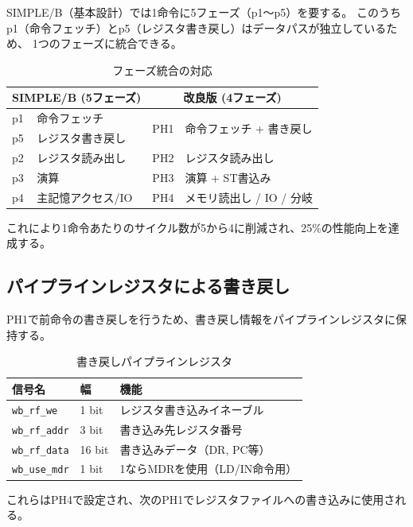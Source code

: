 \documentclass[a4paper,11pt]{ltjsarticle}
\begin{document}
SIMPLE/B（基本設計）では1命令に5フェーズ（p1〜p5）を要する。
このうちp1（命令フェッチ）とp5（レジスタ書き戻し）はデータパスが独立しているため、
1つのフェーズに統合できる。

\begin{table}[h]
\centering
\caption{フェーズ統合の対応}
\begin{tabular}{ll|ll}
\toprule
\multicolumn{2}{c|}{SIMPLE/B (5フェーズ)} & \multicolumn{2}{c}{改良版 (4フェーズ)} \\
\midrule
p1 & 命令フェッチ         & \multirow{2}{*}{PH1} & \multirow{2}{*}{命令フェッチ + 書き戻し} \\
p5 & レジスタ書き戻し     &                       &                                   \\
p2 & レジスタ読み出し     & PH2 & レジスタ読み出し \\
p3 & 演算                 & PH3 & 演算 + ST書込み \\
p4 & 主記憶アクセス/IO    & PH4 & メモリ読出し / IO / 分岐 \\
\bottomrule
\end{tabular}
\end{table}

これにより1命令あたりのサイクル数が5から4に削減され、25\%の性能向上を達成する。

\subsection{パイプラインレジスタによる書き戻し}

PH1で前命令の書き戻しを行うため、書き戻し情報をパイプラインレジスタに保持する。

\begin{table}[h]
\centering
\caption{書き戻しパイプラインレジスタ}
\begin{tabular}{lll}
\toprule
信号名 & 幅 & 機能 \\
\midrule
\texttt{wb\_rf\_we}   & 1 bit  & レジスタ書き込みイネーブル \\
\texttt{wb\_rf\_addr} & 3 bit  & 書き込み先レジスタ番号 \\
\texttt{wb\_rf\_data} & 16 bit & 書き込みデータ（DR, PC等） \\
\texttt{wb\_use\_mdr} & 1 bit  & 1ならMDRを使用（LD/IN命令用） \\
\bottomrule
\end{tabular}
\end{table}

これらはPH4で設定され、次のPH1でレジスタファイルへの書き込みに使用される。
\end{document}
